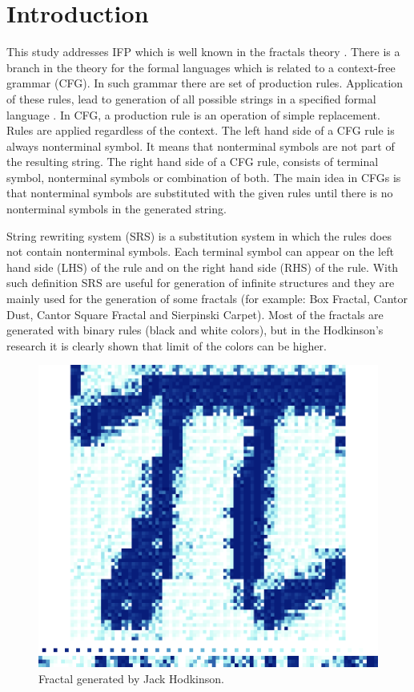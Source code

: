 \documentclass{llncs}
\begin{document}
\section{Introduction} \label{Introduction}

This study addresses IFP which is well known in the fractals theory \cite{guerin01,nettleton01}. There is a branch in the theory for the formal languages which is related to a context-free grammar (CFG). In such grammar there are set of production rules. Application of these rules, lead to generation of all possible strings in a specified formal language \cite{ochoa01}. In CFG, a production rule is an operation of simple replacement. Rules are applied regardless of the context. The left hand side of a CFG rule is always nonterminal symbol. It means that nonterminal symbols are not part of the resulting string. The right hand side of a CFG rule, consists of terminal symbol, nonterminal symbols or combination of both. The main idea in CFGs is that nonterminal symbols are substituted with the given rules until there is no nonterminal symbols in the generated string.

String rewriting system (SRS) is a substitution system in which the rules does not contain nonterminal symbols. Each terminal symbol can appear on the left hand side (LHS) of the rule and on the right hand side (RHS) of the rule. With such definition SRS are useful for generation of infinite structures and they are mainly used for the generation of some fractals (for example: Box Fractal, Cantor Dust, Cantor Square Fractal and Sierpinski Carpet). Most of the fractals are generated with binary rules (black and white colors), but in the Hodkinson's research it is clearly shown that limit of the colors can be higher.

\begin{figure}[h!]
  \centering
  \includegraphics[width=0.5\linewidth]{pic01}
  \caption{Fractal generated by Jack Hodkinson.}
\label{fig:pic01}
\end{figure}
\end{document}

